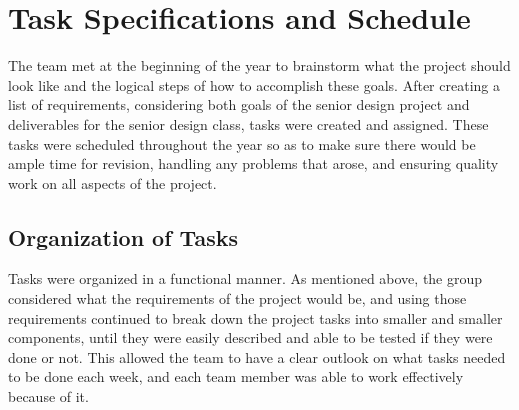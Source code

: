 \documentclass[PPFS.tex]{template/subfiles}
\begin{document}
\begin{comment}
These are the requirements as stated in the template given by Profess M.

    Detailed task specifications are a key part of your design.  Tasks that take more than a day or two should be broken down into sub-tasks whenever possible.  Typically tasks specs and schedule are combined since they are intimately related.  The percentage complete on each task should be included in the PPFS.  Address any issues related to tasks that are behind schedule in the project management section.  Organize tasks hierarchically, such as system architecture, mechanical, electrical (hardware, software), etc.  Provide block diagrams to help explain how you divided the project into various phases/parts/categories.  
    Many teams make the mistake of thinking the prototype is the design.  This is rarely the case.  Only a few teams produce a single device.  Most are designing a product that can be mass produced.  Thus the prototype is your method of validating your production design.   It is a major test or validation activity on the way to completing the design.  Include prototyping activities as tasks that help you finish the production design.  
    Summarize your schedule by reporting the total expected person-hours needed to complete the design.  The best reports track the schedule progress by reporting the month by month estimate of total person-hours and graphing how it changed as you gained experience.
\end{comment}

\section{Task Specifications and Schedule}
The team met at the beginning of the year to brainstorm what the project should look like and the logical steps of how to accomplish these goals. After creating a list of requirements, considering both goals of the senior design project and deliverables for the senior design class, tasks were created and assigned. These tasks were scheduled throughout the year so as to make sure there would be ample time for revision, handling any problems that arose, and ensuring quality work on all aspects of the project.

\subsection{Organization of Tasks}
Tasks were organized in a functional manner. As mentioned above, the group considered what the requirements of the project would be, and using those requirements continued to break down the project tasks into smaller and smaller components, until they were easily described and able to be tested if they were done or not. This allowed the team to have a clear outlook on what tasks needed to be done each week, and each team member was able to work effectively because of it. 
\end{document}
